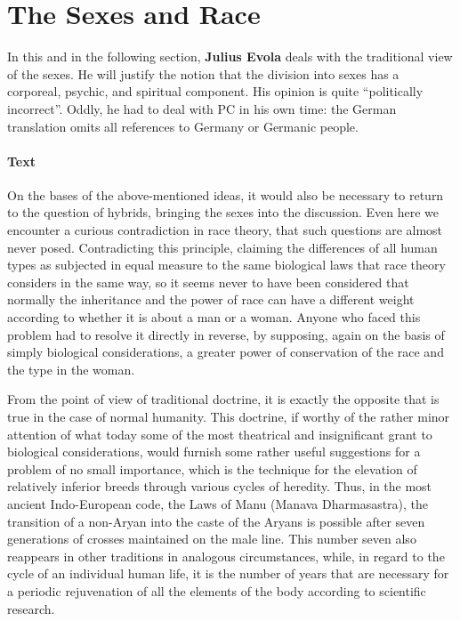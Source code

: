 \section{The Sexes and Race}

\begin{quotex}
In this and in the following section, \textbf{Julius Evola} deals with the traditional view of the sexes. He will justify the notion that the division into sexes has a corporeal, psychic, and spiritual component. His opinion is quite ``politically incorrect''. Oddly, he had to deal with PC in his own time: the German translation omits all references to Germany or Germanic people.
\end{quotex}


\paragraph{Text}


On the bases of the above-mentioned ideas, it would also be necessary to return to the question of hybrids, bringing the sexes into the discussion. Even here we encounter a curious contradiction in race theory, that such questions are almost never posed. Contradicting this principle, claiming the differences of all human types as subjected in equal measure to the same biological laws that race theory considers in the same way, so it seems never to have been considered that normally the inheritance and the power of race can have a different weight according to whether it is about a man or a woman. Anyone who faced this problem had to resolve it directly in reverse, by supposing, again on the basis of simply biological considerations, a greater power of conservation of the race and the type in the woman.

From the point of view of traditional doctrine, it is exactly the opposite that is true in the case of normal humanity. This doctrine, if worthy of the rather minor attention of what today some of the most theatrical and insignificant grant to biological considerations, would furnish some rather useful suggestions for a problem of no small importance, which is the technique for the elevation of relatively inferior breeds through various cycles of heredity. Thus, in the most ancient Indo-European code, the Laws of Manu (Manava Dharmasastra), the transition of a non-Aryan into the caste of the Aryans is possible after seven generations of crosses maintained on the male line. This number seven also reappears in other traditions in analogous circumstances, while, in regard to the cycle of an individual human life, it is the number of years that are necessary for a periodic rejuvenation of all the elements of the body according to scientific research.

